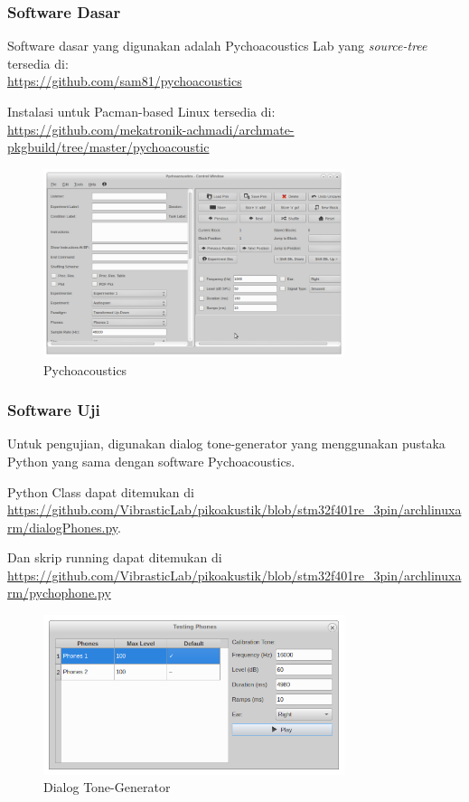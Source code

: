 \documentclass[12pt,]{article}
\begin{document}
	\subsubsection{Software Dasar}
	
	Software dasar yang digunakan adalah Pychoacoustics Lab yang \textit{source-tree} tersedia di:\\
	\url{https://github.com/sam81/pychoacoustics}
	
	Instalasi untuk Pacman-based Linux tersedia di:\\
	\url{https://github.com/mekatronik-achmadi/archmate-pkgbuild/tree/master/pychoacoustic}
	
	\begin{figure}[!ht]
		\centering
		\includegraphics[width=250pt]{images/screen/piko}
		\caption{Pychoacoustics}
	\end{figure}

	\subsubsection{Software Uji}
	
	Untuk pengujian, digunakan dialog tone-generator yang menggunakan pustaka Python yang sama dengan software Pychoacoustics.
	
	Python Class dapat ditemukan di \url{https://github.com/VibrasticLab/pikoakustik/blob/stm32f401re_3pin/archlinuxarm/dialogPhones.py}.
	
	Dan skrip running dapat ditemukan di \url{https://github.com/VibrasticLab/pikoakustik/blob/stm32f401re_3pin/archlinuxarm/pychophone.py}
	
	\begin{figure}[!ht]
		\centering
		\includegraphics[width=250pt]{images/screen/phone}
		\caption{Dialog Tone-Generator}
	\end{figure}
\end{document}

